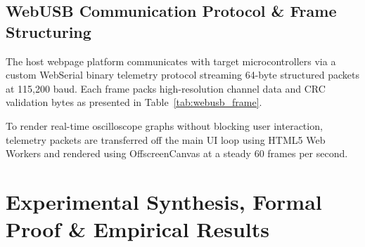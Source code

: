 \documentclass[conference]{IEEEtran}
\begin{document}
\subsection{WebUSB Communication Protocol \& Frame Structuring}
The host webpage platform communicates with target microcontrollers via a custom WebSerial binary telemetry protocol streaming 64-byte structured packets at 115,200 baud. Each frame packs high-resolution channel data and CRC validation bytes as presented in Table~\ref{tab:webusb_frame}.

\begin{table}[htbp]
\caption{WebUSB 64-Byte Binary Telemetry Frame Specification}
\label{tab:webusb_frame}
\begin{center}
\end{center}
\end{table}

To render real-time oscilloscope graphs without blocking user interaction, telemetry packets are transferred off the main UI loop using HTML5 Web Workers and rendered using OffscreenCanvas at a steady 60 frames per second.

\section{Experimental Synthesis, Formal Proof \& Empirical Results}
\end{document}
